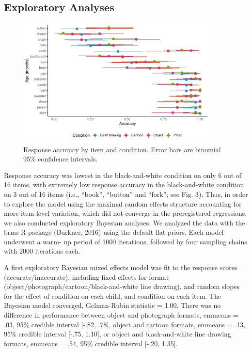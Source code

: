 \documentclass[10pt, letterpaper]{article}
\begin{document}
\subsection{Exploratory Analyses}\label{exploratory-analyses}

\begin{CodeChunk}
\begin{figure}[tb]

{\centering \includegraphics[width=4in]{figs/fig3-1} 

}

\caption[Response accuracy by item and condition]{Response accuracy by item and condition. Error bars are binomial 95\% confidence intervals.}\label{fig:fig3}
\end{figure}
\end{CodeChunk}

Response accuracy was lowest in the black-and-white condition on only 6
out of 16 items, with extremely low response accuracy in the
black-and-white condition on 3 out of 16 items (i.e., ``book'',
``button'' and ``fork''; see Fig. 3). Thus, in order to explore the
model using the maximal random effects structure accounting for more
item-level variation, which did not converge in the preregistered
regressions, we also conducted exploratory Bayesian analyses. We
analyzed the data with the brms R package (Burkner, 2016) using the
default flat priors. Each model underwent a warm- up period of 1000
iterations, followed by four sampling chains with 2000 iterations each.

A first exploratory Bayesian mixed effects model was fit to the response
scores (accurate/inaccurate), including fixed effects for format
(object/photograph/cartoon/black-and-white line drawing), and random
slopes for the effect of condition on each child, and condition on each
item. The Bayesian model converged, Gelman-Rubin statistic = 1.00. There
was no difference in performance between object and photograph formats,
emmeans = .03, 95\% credible interval {[}-.82, .78{]}, object and
cartoon formats, emmeans = .13, 95\% credible interval {[}-.75, 1.10{]},
or object and black-and-white line drawing formats, emmeans = .54, 95\%
credible interval {[}-.20, 1.35{]}.
\end{document}
